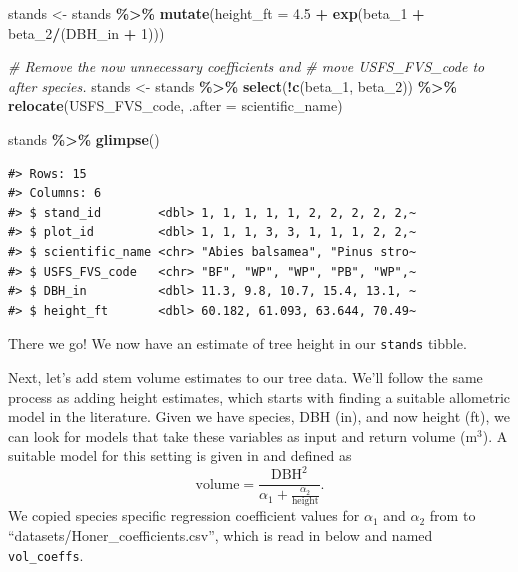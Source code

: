 \documentclass[
  11pt,
]{krantz}
\newenvironment{Shaded}{\begin{snugshade}}{\end{snugshade}}
\newcommand{\CommentTok}[1]{\textcolor[rgb]{0.56,0.35,0.01}{\textit{#1}}}
\newcommand{\DataTypeTok}[1]{\textcolor[rgb]{0.13,0.29,0.53}{#1}}
\newcommand{\DecValTok}[1]{\textcolor[rgb]{0.00,0.00,0.81}{#1}}
\newcommand{\FloatTok}[1]{\textcolor[rgb]{0.00,0.00,0.81}{#1}}
\newcommand{\KeywordTok}[1]{\textcolor[rgb]{0.13,0.29,0.53}{\textbf{#1}}}
\newcommand{\NormalTok}[1]{#1}
\newcommand{\OperatorTok}[1]{\textcolor[rgb]{0.81,0.36,0.00}{\textbf{#1}}}
\newcommand{\StringTok}[1]{\textcolor[rgb]{0.31,0.60,0.02}{#1}}
\theoremstyle{definition}
\theoremstyle{definition}
\theoremstyle{definition}
\theoremstyle{definition}
\theoremstyle{remark}
\begin{document}
\begin{Shaded}
\begin{Highlighting}[]
\NormalTok{stands \textless{}{-}}\StringTok{ }\NormalTok{stands }\OperatorTok{\%\textgreater{}\%}\StringTok{ }
\StringTok{  }\KeywordTok{mutate}\NormalTok{(}\DataTypeTok{height\_ft =} \FloatTok{4.5} \OperatorTok{+}\StringTok{ }\KeywordTok{exp}\NormalTok{(beta\_}\DecValTok{1} \OperatorTok{+}\StringTok{ }\NormalTok{beta\_}\DecValTok{2}\OperatorTok{/}\NormalTok{(DBH\_in }\OperatorTok{+}\StringTok{ }\DecValTok{1}\NormalTok{)))}

\CommentTok{\# Remove the now unnecessary coefficients and }
\CommentTok{\# move USFS\_FVS\_code to after species.}
\NormalTok{stands \textless{}{-}}\StringTok{ }\NormalTok{stands }\OperatorTok{\%\textgreater{}\%}\StringTok{ }\KeywordTok{select}\NormalTok{(}\OperatorTok{!}\KeywordTok{c}\NormalTok{(beta\_}\DecValTok{1}\NormalTok{, beta\_}\DecValTok{2}\NormalTok{)) }\OperatorTok{\%\textgreater{}\%}\StringTok{ }
\StringTok{  }\KeywordTok{relocate}\NormalTok{(USFS\_FVS\_code, }\DataTypeTok{.after =}\NormalTok{ scientific\_name)}

\NormalTok{stands }\OperatorTok{\%\textgreater{}\%}\StringTok{ }\KeywordTok{glimpse}\NormalTok{()}
\end{Highlighting}
\end{Shaded}

\begin{verbatim}
#> Rows: 15
#> Columns: 6
#> $ stand_id        <dbl> 1, 1, 1, 1, 1, 2, 2, 2, 2, 2,~
#> $ plot_id         <dbl> 1, 1, 1, 3, 3, 1, 1, 1, 2, 2,~
#> $ scientific_name <chr> "Abies balsamea", "Pinus stro~
#> $ USFS_FVS_code   <chr> "BF", "WP", "WP", "PB", "WP",~
#> $ DBH_in          <dbl> 11.3, 9.8, 10.7, 15.4, 13.1, ~
#> $ height_ft       <dbl> 60.182, 61.093, 63.644, 70.49~
\end{verbatim}

There we go! We now have an estimate of tree height in our \texttt{stands} tibble.

Next, let's add stem volume estimates to our tree data. We'll follow the same process as adding height estimates, which starts with finding a suitable allometric model in the literature. Given we have species, DBH (in), and now height (ft), we can look for models that take these variables as input and return volume (m\(^3\)). A suitable model for this setting is given in \citet{Honer1967} and defined as
\begin{equation}
 \text{volume} = \frac{\text{DBH}^2}{\alpha_1 + \frac{\alpha_2}{\text{height}}}.
 \label{eq:honer}
\end{equation}
We copied species specific regression coefficient values for \(\alpha_1\) and \(\alpha_2\) from \citet{Honer1967} to ``datasets/Honer\_coefficients.csv'', which is read in below and named \texttt{vol\_coeffs}.
\end{document}
